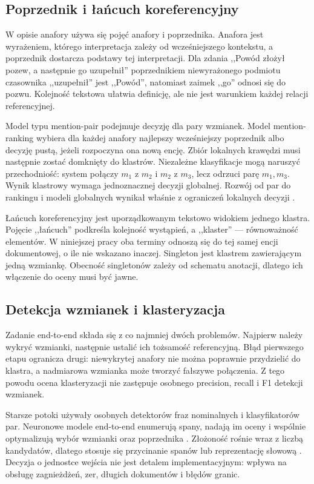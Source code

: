 \subsection{Poprzednik i łańcuch koreferencyjny}

W opisie anafory używa się pojęć anafory i poprzednika. Anafora jest wyrażeniem, którego interpretacja zależy od wcześniejszego kontekstu, a poprzednik dostarcza podstawy tej interpretacji. Dla zdania ,,Powód złożył pozew, a następnie go uzupełnił'' poprzednikiem niewyrażonego podmiotu czasownika ,,uzupełnił'' jest ,,Powód'', natomiast zaimek ,,go'' odnosi się do pozwu. Kolejność tekstowa ułatwia definicję, ale nie jest warunkiem każdej relacji referencyjnej.

Model typu mention-pair podejmuje decyzję dla pary wzmianek. Model mention-ranking wybiera dla każdej anafory najlepszy wcześniejszy poprzednik albo decyzję pustą, jeżeli rozpoczyna ona nową encję. Zbiór lokalnych krawędzi musi następnie zostać domknięty do klastrów. Niezależne klasyfikacje mogą naruszyć przechodniość: system połączy $m_1$ z $m_2$ i $m_2$ z $m_3$, lecz odrzuci parę $m_1,m_3$. Wynik klastrowy wymaga jednoznacznej decyzji globalnej. Rozwój od par do rankingu i modeli globalnych wynikał właśnie z ograniczeń lokalnych decyzji \cite{soon_2001_machine,denis_2008_specialized,wiseman_2016_global}.

Łańcuch koreferencyjny jest uporządkowanym tekstowo widokiem jednego klastra. Pojęcie ,,łańcuch'' podkreśla kolejność wystąpień, a ,,klaster'' --- równoważność elementów. W niniejszej pracy oba terminy odnoszą się do tej samej encji dokumentowej, o ile nie wskazano inaczej. Singleton jest klastrem zawierającym jedną wzmiankę. Obecność singletonów zależy od schematu anotacji, dlatego ich włączenie do oceny musi być jawne.

\subsection{Detekcja wzmianek i klasteryzacja}

Zadanie end-to-end składa się z co najmniej dwóch problemów. Najpierw należy wykryć wzmianki, następnie ustalić ich tożsamość referencyjną. Błąd pierwszego etapu ogranicza drugi: niewykrytej anafory nie można poprawnie przydzielić do klastra, a nadmiarowa wzmianka może tworzyć fałszywe połączenia. Z tego powodu ocena klasteryzacji nie zastępuje osobnego precision, recall i F1 detekcji wzmianek.

Starsze potoki używały osobnych detektorów fraz nominalnych i klasyfikatorów par. Neuronowe modele end-to-end enumerują spany, nadają im oceny i wspólnie optymalizują wybór wzmianki oraz poprzednika \cite{lee_2017_e2e,lee_2018_higher}. Złożoność rośnie wraz z liczbą kandydatów, dlatego stosuje się przycinanie spanów lub reprezentację słowową \cite{dobrovolskii_2021_word,kirstain_2021_s2e}. Decyzja o jednostce wejścia nie jest detalem implementacyjnym: wpływa na obsługę zagnieżdżeń, zer, długich dokumentów i błędów granic.

